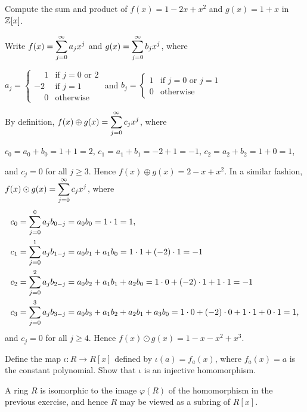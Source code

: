 \documentclass[11pt,fleqn,dvipsnames,usenames]{article}
\begin{document}
\begin{example}
Compute the sum and product of $f(x) = 1 - 2x + x^2$ and $g(x) = 1 + x$ in $\mathbb{Z}[x]$.
\end{example}
%
\begin{solution}
Write $f(x) = \displaystyle\sum\limits_{j=0}^{\infty}a_{j}x^{j}$ and $g(x) = \displaystyle\sum\limits_{j=0}^{\infty}b_{j}x^{j}$, where
\begin{center}
$a_{j} = \begin{cases}\phantom{-}1 & \text{if } j=0\text{ or }2\\-2 & \text{if } j = 1\\\phantom{-}0 & \text{otherwise}\end{cases}$ and 
$b_{j} = \begin{cases}1 & \text{if } j=0\text{ or }j=1\\0 & \text{otherwise}\end{cases}$
\end{center}
By definition, $f(x)\oplus g(x) = \displaystyle\sum\limits_{j=0}^{\infty}c_{j}x^{j}$, where
\begin{center}
$c_{0} = a_{0} + b_{0} = 1 + 1 = 2$,\hspace{1cm} $c_{1} = a_{1} + b_{1} = -2 + 1 = -1$,\hspace{1cm} $c_{2} = a_{2} + b_{2} = 1 + 0 = 1$,
\end{center}
and $c_{j} = 0$ for all $j\geq 3$.  Hence $f(x) \oplus g(x) = 2 - x + x^2$.  In a similar fashion, $f(x)\odot g(x) = \displaystyle\sum\limits_{j=0}^{\infty}c_{j}x^{j}$, where
\begin{align*}
c_{0} &= \displaystyle\sum\limits_{j=0}^{0}a_{j}b_{0-j} = a_{0}b_{0} = 1\cdot 1 = 1,\\
c_{1} &= \displaystyle\sum\limits_{j=0}^{1}a_{j}b_{1-j} = a_{0}b_{1} + a_{1}b_{0} = 1\cdot 1 + (-2)\cdot 1 = -1\\
c_{2} &= \displaystyle\sum\limits_{j=0}^{2}a_{j}b_{2-j} = a_{0}b_{2} + a_{1}b_{1} + a_{2}b_{0} = 1\cdot 0 + (-2)\cdot 1 + 1\cdot 1 = -1\\
c_{3} &= \displaystyle\sum\limits_{j=0}^{3}a_{j}b_{3-j} = a_{0}b_{3} + a_{1}b_{2} + a_{2}b_{1} + a_{3}b_{0} = 1\cdot 0 + (-2)\cdot 0 + 1\cdot 1 + 0\cdot 1 = 1\text{,}
\end{align*}
and $c_{j} = 0$ for all $j\geq 4$.  Hence $f(x) \odot g(x) = 1 - x - x^2 + x^3$.
\end{solution}
\vsp

%
\begin{exercise}
Define the map $\iota:R\to R[x]$ defined by $\iota(a) = f_{a}(x)$, where $f_{a}(x) = a$ is the constant polynomial.  Show that $\iota$ is an injective homomorphism.
\end{exercise}
%
\begin{remark} A ring $R$ is isomorphic to the image $\varphi(R)$ of the homomorphism in the previous exercise, and hence $R$ may be viewed as a subring of $R[x]$.
\end{remark}
\newpage
\end{document}
